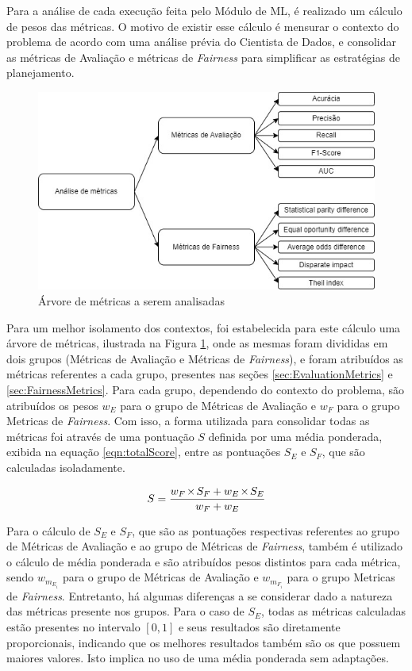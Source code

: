 \documentclass[Portugues,Final]{ic-tese-v3}
\let\oldtimes\times
\def\times{{\mkern1mu\oldtimes\mkern1mu}}
\begin{document}
Para a análise de cada execução feita pelo Módulo de ML, é realizado um cálculo de pesos das métricas. O motivo de existir esse cálculo é mensurar o contexto do problema de acordo com uma análise prévia do Cientista de Dados, e consolidar as métricas de Avaliação e métricas de \textit{Fairness} para simplificar as estratégias de planejamento.

\begin{figure}[H]
\centering
\includegraphics[scale=0.6]{images/Arvore_Metricas.jpg}
\caption {Árvore de métricas a serem analisadas}
\label{fig:ArvoreMetricas}
\end{figure}

Para um melhor isolamento dos contextos, foi estabelecida para este cálculo uma árvore de métricas, ilustrada na Figura \ref{fig:ArvoreMetricas}, onde as mesmas foram divididas em dois grupos (Métricas de Avaliação e Métricas de \textit{Fairness}), e foram atribuídos as métricas referentes a cada grupo, presentes nas seções \ref{sec:EvaluationMetrics} e \ref{sec:FairnessMetrics}. Para cada grupo, dependendo do contexto do problema, são atribuídos os pesos $w_E$ para o grupo de Métricas de Avaliação e $w_F$ para o grupo Metricas de \textit{Fairness}. Com isso, a forma utilizada para consolidar todas as métricas foi através de uma pontuação $S$ definida por uma média ponderada, exibida na equação \ref{eqn:totalScore}, entre as pontuações $S_E$ e $S_F$, que são calculadas isoladamente.

\begin{equation}
\label{eqn:totalScore}
	S = \frac{w_F \times S_{F} + w_E \times S_{E}}{w_F + w_E}
\end{equation}

Para o cálculo de $S_E$ e $S_F$, que são as pontuações respectivas referentes ao grupo de Métricas de Avaliação e ao grupo de Métricas de \textit{Fairness}, também é utilizado o cálculo de média ponderada e são atribuídos pesos distintos para cada métrica, sendo $w_{m_{E_i}}$ para o grupo de Métricas de Avaliação e $w_{m_{F_i}}$ para o grupo Metricas de \textit{Fairness}. Entretanto, há algumas diferenças a se considerar dado a natureza das métricas presente nos grupos. Para o caso de $S_E$, todas as métricas calculadas estão presentes no intervalo $\left[0,1 \right]$ e seus resultados são diretamente proporcionais, indicando que os melhores resultados também são os que possuem maiores valores. Isto implica no uso de uma média ponderada sem adaptações.
\end{document}
